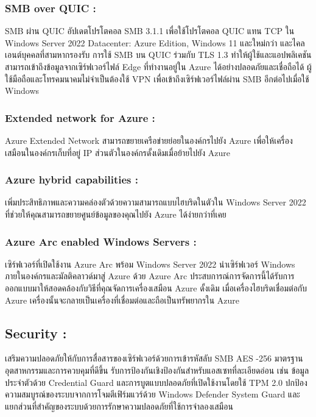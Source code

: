 \hspace{1cm}\subsubsection{SMB over QUIC : } SMB ผ่าน QUIC อัปเดตโปรโตคอล SMB 3.1.1 เพื่อใช้โปรโตคอล QUIC แทน TCP ใน Windows Server 2022 Datacenter: Azure Edition, Windows 11 และใหม่กว่า และไคลเอนต์บุคคลที่สามหากรองรับ การใช้ SMB บน QUIC ร่วมกับ TLS 1.3 ทำให้ผู้ใช้และแอปพลิเคชันสามารถเข้าถึงข้อมูลจากเซิร์ฟเวอร์ไฟล์ Edge ที่ทำงานอยู่ใน Azure ได้อย่างปลอดภัยและเชื่อถือได้ ผู้ใช้มือถือและโทรคมนาคมไม่จำเป็นต้องใช้ VPN เพื่อเข้าถึงเซิร์ฟเวอร์ไฟล์ผ่าน SMB อีกต่อไปเมื่อใช้ Windows 

\hspace{1cm}\subsubsection{Extended network for Azure : } Azure Extended Network สามารถขยายเครือข่ายย่อยในองค์กรไปยัง Azure เพื่อให้เครื่องเสมือนในองค์กรเก็บที่อยู่ IP ส่วนตัวในองค์กรดั้งเดิมเมื่อย้ายไปยัง Azure 
\clearpage

\hspace{1cm}\subsubsection{Azure hybrid capabilities : } เพิ่มประสิทธิภาพและความคล่องตัวด้วยความสามารถแบบไฮบริดในตัวใน Windows Server 2022 ที่ช่วยให้คุณสามารถขยายศูนย์ข้อมูลของคุณไปยัง Azure ได้ง่ายกว่าที่เคย 

\hspace{1cm}\subsubsection{Azure Arc enabled Windows Servers : } เซิร์ฟเวอร์ที่เปิดใช้งาน Azure Arc พร้อม Windows Server 2022 นำเซิร์ฟเวอร์ Windows ภายในองค์กรและมัลติคลาวด์มาสู่ Azure ด้วย Azure Arc ประสบการณ์การจัดการนี้ได้รับการออกแบบมาให้สอดคล้องกับวิธีที่คุณจัดการเครื่องเสมือน Azure ดั้งเดิม เมื่อเครื่องไฮบริดเชื่อมต่อกับ Azure เครื่องนั้นจะกลายเป็นเครื่องที่เชื่อมต่อและถือเป็นทรัพยากรใน Azure 

\vspace{2cm}

\hspace{0cm}\subsection{Security : } เสริมความปลอดภัยให้กับการสื่อสารของเซิร์ฟเวอร์ด้วยการเข้ารหัสลับ SMB AES -256 มาตรฐานอุตสาหกรรมและการควบคุมที่ดีขึ้น รับการป้องกันเชิงป้องกันสำหรับแอสเซทที่ละเอียดอ่อน เช่น ข้อมูลประจำตัวด้วย Credential Guard และการบูตแบบปลอดภัยที่เปิดใช้งานโดยใช้ TPM 2.0 ปกป้องความสมบูรณ์ของระบบจากการโจมตีเฟิร์มแวร์ด้วย Windows Defender System Guard และแยกส่วนที่สำคัญของระบบด้วยการรักษาความปลอดภัยที่ใช้การจำลองเสมือน  

